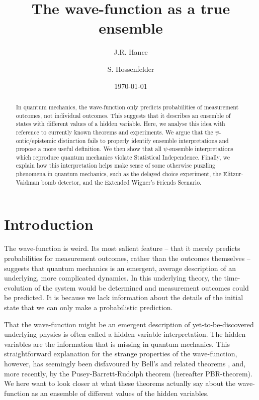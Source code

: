 \documentclass[superscriptaddress,twocolumn,floatfix,nofootinbib]{revtex4-2}
\begin{document}
\title{The wave-function as a true ensemble}
\author{J.R. Hance}
\author{S. Hossenfelder}
\date{\today}

\begin{abstract}
In quantum mechanics, the wave-function only predicts probabilities of measurement outcomes, not individual outcomes. This suggests that it describes an ensemble of states with different values of a hidden variable. Here, we analyse this idea with reference to currently known theorems and experiments. We argue that the $\psi$-ontic/epistemic distinction fails to properly identify ensemble interpretations and propose a more useful definition. We then show that all $\psi$-ensemble interpretations which reproduce quantum mechanics violate Statistical Independence. Finally, we explain how this interpretation helps make sense of some otherwise puzzling phenomena in quantum mechanics, such as the delayed choice experiment, the Elitzur-Vaidman bomb detector, and the Extended Wigner's Friends Scenario.
\end{abstract}

\maketitle

\section{Introduction}

The wave-function is weird. Its most salient feature -- that it merely predicts probabilities for measurement outcomes, rather than the outcomes themselves -- suggests that quantum mechanics is an emergent, average description of an underlying, more complicated dynamics. In this underlying theory, the time-evolution of the system would be determined and measurement outcomes could be predicted. It is because we lack information about the details of the initial state that we can only make a probabilistic prediction.  

That the wave-function might be an emergent description of yet-to-be-discovered underlying physics is often called a hidden variable interpretation. The hidden variables are the information that is missing in quantum mechanics. This straightforward explanation for the strange properties of the wave-function, however, has seemingly been disfavoured by Bell's and related theorems \cite{Bell1964OnEPR,Clauser1969CHSH}, and, more recently, by the Pusey-Barrett-Rudolph theorem \cite{Pusey2012Reality,Leifer_2014} (hereafter {\sc PBR}-theorem). We here want to look closer at what these theorems actually say about the wave-function as an ensemble of different values of the hidden variables. 
\end{document}
